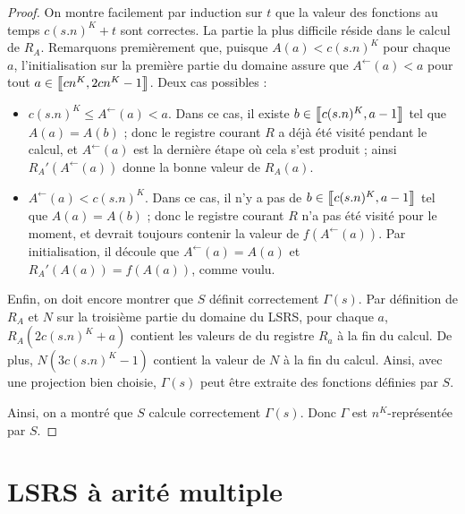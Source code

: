 \begin{proof}
			On montre facilement par induction sur $t$ que la valeur des fonctions au temps $c(s.n)^K+t$ sont correctes. La partie la plus difficile réside dans le calcul de $R_A$. Remarquons premièrement que, puisque $A(a) < c(s.n)^K$ pour chaque $a$, l'initialisation sur la première partie du domaine assure que $A^{\leftarrow}(a) < a$ pour tout $a \in \left[\!\!\>\!\left[ cn^K , 2cn^K-1 \right]\!\!\>\!\right]$. Deux cas possibles :
			
			\begin{itemize}[itemsep=-1mm]
				\item 	
					$c(s.n)^K \leqslant A^{\leftarrow}(a) < a$. Dans ce cas, il existe $b \in \left[\!\!\>\!\left[ c(s.n)^K , a-1 \right]\!\!\>\!\right]$ tel que $A(a) = A(b)$ ; donc le registre courant $R$ a déjà été visité pendant le calcul, et $A^{\leftarrow}(a)$ est la dernière étape où cela s'est produit ; ainsi $R_A'\left(A^{\leftarrow}(a)\right)$ donne la bonne valeur de $R_A(a)$.
					
				\item 
					$A^{\leftarrow}(a) < c(s.n)^K$. Dans ce cas, il n'y a pas de $b \in \left[\!\!\>\!\left[ c(s.n)^K , a-1 \right]\!\!\>\!\right]$ tel que $A(a) = A(b)$ ; donc le registre courant $R$ n'a pas été visité pour le moment, et devrait toujours contenir la valeur de $f(A^{\leftarrow}(a))$\footnotemark. Par initialisation, il découle que $A^{\leftarrow}(a) = A(a)$ et $R_A'(A(a)) = f(A(a))$, comme voulu.
					
			\end{itemize}
			
			Enfin, on doit encore montrer que $S$ définit correctement $\Gamma(s)$. Par définition de $R_A$ et $N$ sur la troisième partie du domaine du LSRS, pour chaque $a$, $R_A\left( 2 c(s.n)^K + a \right)$ contient les valeurs de du registre $R_a$ à la fin du calcul. De plus, $N(3c(s.n)^K-1)$ contient la valeur de $N$ à la fin du calcul. Ainsi, avec une projection bien choisie, $\Gamma(s)$ peut être extraite des fonctions définies par $S$. 
			
			Ainsi, on a montré que $S$ calcule correctement $\Gamma(s)$. Donc $\Gamma$ est $n^K$-représentée par $S$.
			
		\end{proof}

		
		
		
		
	\pagebreak
	 
	\pagebreak
		
	\chapter{LSRS à arité multiple}
	\label{chap:rLSRS}
	
